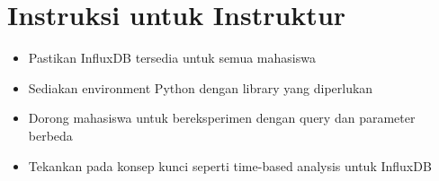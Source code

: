 \section{Instruksi untuk Instruktur}
\begin{itemize}
    \item Pastikan InfluxDB tersedia untuk semua mahasiswa
    \item Sediakan environment Python dengan library yang diperlukan
    \item Dorong mahasiswa untuk bereksperimen dengan query dan parameter berbeda
    \item Tekankan pada konsep kunci seperti time-based analysis untuk InfluxDB
\end{itemize}